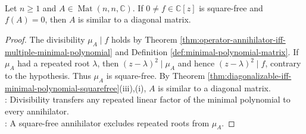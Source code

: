 \begin{corollary} \label{cor:squarefree-annihilator-implies-diagonalizable} \\
Let $n\geq1$ and $A\in\operatorname{Mat}(n,n,\mathbb{C})$. If $0\neq f\in\mathbb{C}[z]$ is square-free and $f(A)=0$, then $A$ is similar to a diagonal matrix.
\begin{proof}
The divisibility $\mu_A\mid f$ holds by Theorem \ref{thm:operator-annihilator-iff-multiple-minimal-polynomial} and Definition \ref{def:minimal-polynomial-matrix}. If $\mu_A$ had a repeated root $\lambda$, then $(z-\lambda)^2\mid\mu_A$ and hence $(z-\lambda)^2\mid f$, contrary to the hypothesis. Thus $\mu_A$ is square-free. By Theorem \ref{thm:diagonalizable-iff-minimal-polynomial-squarefree}(iii),(i), $A$ is similar to a diagonal matrix.\\
: Divisibility transfers any repeated linear factor of the minimal polynomial to every annihilator.\\
: A square-free annihilator excludes repeated roots from $\mu_A$.
\end{proof}
\end{corollary}

